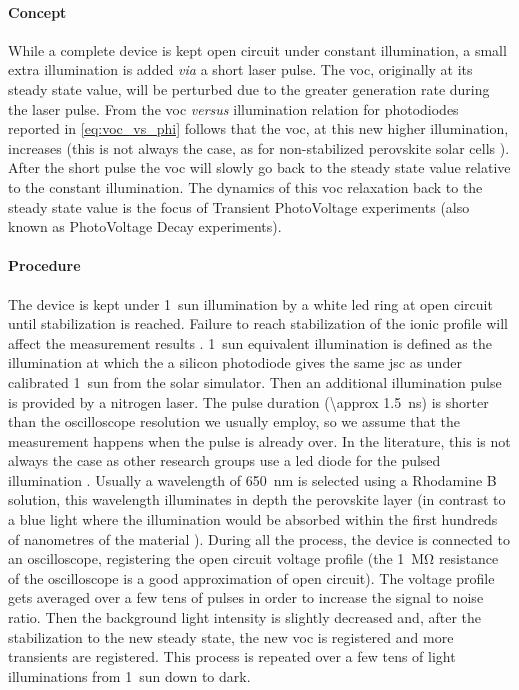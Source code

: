 	\paragraph{Concept} While a complete device is kept open circuit under constant illumination, a small extra illumination is added \textit{via} a short laser pulse.
	The \gls{voc}, originally at its steady state value, will be perturbed due to the greater generation rate during the laser pulse.
	From the \gls{voc} \textit{versus} illumination relation for photodiodes reported in \cref{eq:voc_vs_phi} follows that the \gls{voc}, at this new higher illumination, increases (this is not always the case, as for non-stabilized perovskite solar cells \cite{Calado2016}).
	After the short pulse the \gls{voc} will slowly go back to the steady state value relative to the constant illumination.
	The dynamics of this \gls{voc} relaxation back to the steady state value is the focus of Transient PhotoVoltage experiments \cite{ORegan2004,ORegan2005,ORegan2006} (also known as PhotoVoltage Decay experiments).

	\paragraph{Procedure}
	The device is kept under 1~sun illumination by a white \gls{led} ring at open circuit until stabilization is reached.
	Failure to reach stabilization of the ionic profile will affect the measurement results \cite{ORegan2015b}.
	1~sun equivalent illumination is defined as the illumination at which the a silicon photodiode gives the same \gls{jsc} as under calibrated 1~sun from the solar simulator.
	Then an additional illumination pulse is provided by a nitrogen laser.
	The pulse duration (\SI{\approx 1.5}{\ns}) is shorter than the oscilloscope resolution we usually employ, so we assume that the measurement happens when the pulse is already over.
	In the literature, this is not always the case as other research groups use a \gls{led} diode for the pulsed illumination \cite{Calado2016}.
	Usually a wavelength of \SI{650}{\nm} is selected using a Rhodamine B solution\cite{RadiantDyesLaser}, this wavelength illuminates in depth the perovskite layer (in contrast to a blue light where the illumination would be absorbed within the first hundreds of nanometres of the material \cite{Bi2016}).
	During all the process, the device is connected to an oscilloscope, registering the open circuit voltage profile (the \SI{1}{\Mohm} resistance of the oscilloscope is a good approximation of open circuit).
	The voltage profile gets averaged over a few tens of pulses in order to increase the signal to noise ratio.
	Then the background light intensity is slightly decreased and, after the stabilization to the new steady state, the new  \gls{voc} is registered and more transients are registered.
	This process is repeated over a few tens of light illuminations from 1~sun down to dark.

